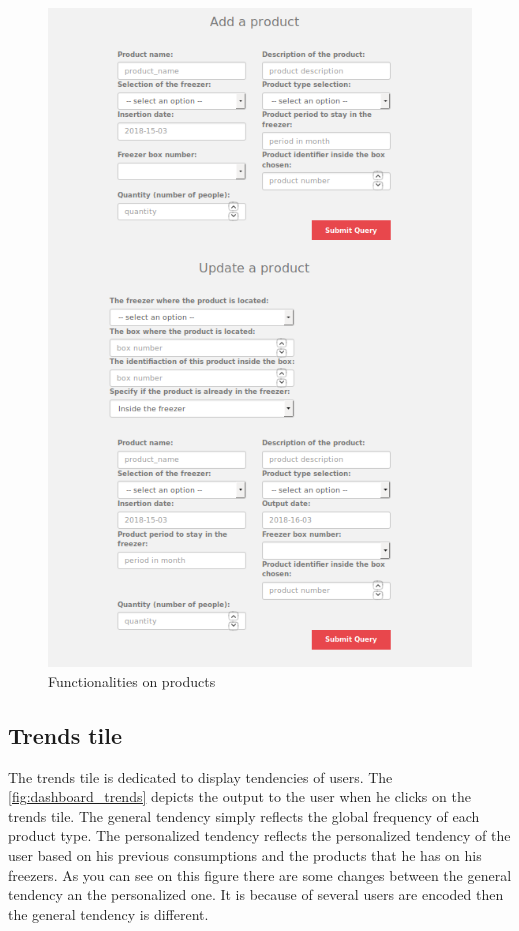 \begin{figure}[H]
\centering
\includegraphics[scale=0.5]{./images/dashboard_products2.png}
\caption{Functionalities on products}
\label{fig:dashboard_products2}
\end{figure}

\subsection{Trends tile}
The trends tile is dedicated to display tendencies of users. The \autoref{fig:dashboard_trends} depicts the output to the user when he clicks on the trends tile. The general tendency simply reflects the global frequency of each product type. The personalized tendency reflects the personalized tendency of the user based on his previous consumptions and the products that he has on his freezers. As you can see on this figure there are some changes between the general tendency an the personalized one. It is because of several users are encoded then the general tendency is different.

